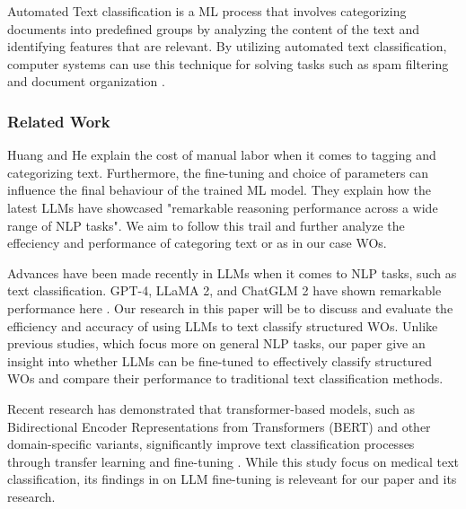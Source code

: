 \documentclass{article}
\begin{document}
Automated Text classification is a ML process that involves categorizing documents
into predefined groups by analyzing the content of the text and identifying features that are relevant.
By utilizing automated text classification, computer systems can use this technique for solving tasks such as spam
filtering and document organization \cite{dalal2011}.

\subsubsection{Related Work}

Huang and He \cite{huang2024} explain the cost of manual labor when it comes to tagging and categorizing text.
Furthermore, the fine-tuning and choice of parameters can influence the final behaviour of the trained ML model.
They explain how the latest LLMs have showcased "remarkable reasoning performance across a wide range of
NLP tasks".
We aim to follow this trail and further analyze the effeciency and performance of categoring text or as in our
case WOs.

Advances have been made recently in LLMs when it comes to NLP tasks, such as text classification.
GPT-4, LLaMA 2, and ChatGLM 2 have shown remarkable performance here \cite{zhang2024}.
Our research in this paper will be to discuss and evaluate the efficiency and accuracy of using LLMs
to text classify structured WOs. Unlike previous studies, which focus more on general NLP tasks,
our paper give an insight into whether LLMs can be fine-tuned to effectively classify structured WOs and
compare their performance to traditional text classification methods.

Recent research has demonstrated that transformer-based models, such as
Bidirectional Encoder Representations from Transformers (BERT) and other domain-specific variants,
significantly improve text classification processes through transfer learning and fine-tuning \cite{Nazyrova2024}.
While this study focus on medical text classification, its findings in on LLM fine-tuning is releveant for our
paper and its research.





\end{document}
